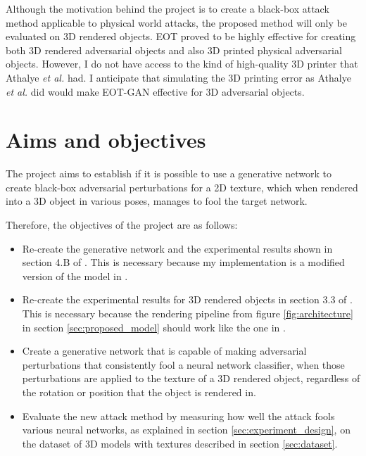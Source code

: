 Although the motivation behind the project is to create a black-box attack method applicable to physical world attacks, the proposed method will only be evaluated on 3D rendered objects. EOT \cite{athalye} proved to be highly effective for creating both 3D rendered adversarial objects and also 3D printed physical adversarial objects. However, I do not have access to the kind of high-quality 3D printer that Athalye \textit{et al.} \cite{athalye} had. I anticipate that simulating the 3D printing error as Athalye \textit{et al.} \cite{athalye} did would make EOT-GAN effective for 3D adversarial objects.

\section{Aims and objectives}
    \label{sec:aims_objectives}

The project aims to establish if it is possible to use a generative network to create black-box adversarial perturbations for a 2D texture, which when rendered into a 3D object in various poses, manages to fool the target network. 

Therefore, the objectives of the project are as follows:

\begin{itemize}
    \item Re-create the generative network and the experimental results shown in section 4.B of \cite{zheng_black_box_GAN}. This is necessary because my implementation is a modified version of the model in \cite{zheng_black_box_GAN}.
    \item Re-create the experimental results for 3D rendered objects in section 3.3 of \cite{athalye}. This is necessary because the rendering pipeline from figure \ref{fig:architecture} in section \ref{sec:proposed_model} should work like the one in \cite{athalye}.
    \item Create a generative network that is capable of making adversarial perturbations that consistently fool a neural network classifier, when those perturbations are applied to the texture of a 3D rendered object, regardless of the rotation or position that the object is rendered in.
    \item Evaluate the new attack method by measuring how well the attack fools various neural networks, as explained in section \ref{sec:experiment_design}, on the dataset of 3D models with textures described in section \ref{sec:dataset}.
\end{itemize}

